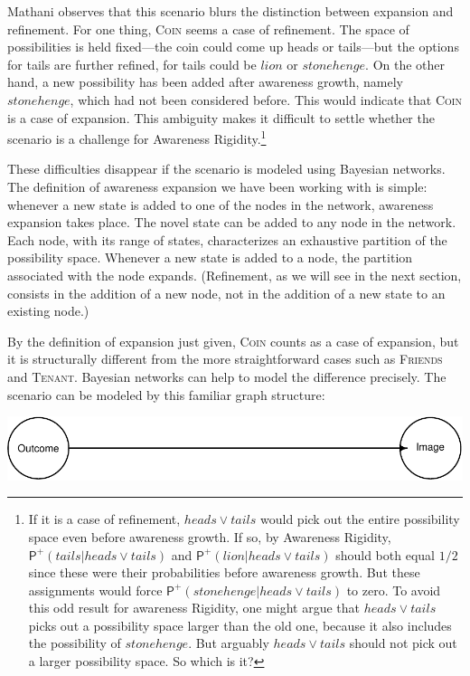 \documentclass[
  11pt,
  dvipsnames,enabledeprecatedfontcommands]{scrartcl}
\newcommand{\ppr}[2]{\ensuremath{\mathsf{P}^{#1}(#2)}}
\begin{document}
Mathani observes that this scenario blurs the distinction between
expansion and refinement. For one thing, \textsc{Coin} seems a case of
refinement. The space of possibilities is held fixed---the coin could
come up heads or tails---but the options for tails are further refined,
for tails could be \(lion\) or \(stonehenge\). On the other hand, a new
possibility has been added after awareness growth, namely
\(stonehenge\), which had not been considered before. This would
indicate that \textsc{Coin} is a case of expansion. This ambiguity makes
it difficult to settle whether the scenario is a challenge for Awareness
Rigidity.\footnote{ If it is a case of refinement, \(heads \vee tails\)
  would pick out the entire possibility space even before awareness
  growth. If so, by Awareness Rigidity,
  \(\ppr{+}{tails \vert heads \vee tails}\) and
  \(\ppr{+}{lion \vert heads \vee tails}\) should both equal \(1/2\)
  since these were their probabilities before awareness growth. But
  these assignments would force
  \(\ppr{+}{stonehenge \vert heads \vee tails}\) to zero. To avoid this
  odd result for awareness Rigidity, one might argue that
  \(heads \vee tails\) picks out a possibility space larger than the old
  one, because it also includes the possibility of \(stonehenge\). But
  arguably \(heads \vee tails\) should not pick out a larger possibility
  space. So which is it?}

These difficulties disappear if the scenario is modeled using Bayesian
networks. The definition of awareness expansion we have been working
with is simple: whenever a new state is added to one of the nodes in the
network, awareness expansion takes place. The novel state can be added
to any node in the network. Each node, with its range of states,
characterizes an exhaustive partition of the possibility space. Whenever
a new state is added to a node, the partition associated with the node
expands. (Refinement, as we will see in the next section, consists in
the addition of a new node, not in the addition of a new state to an
existing node.)

By the definition of expansion just given, \textsc{Coin} counts as a
case of expansion, but it is structurally different from the more
straightforward cases such as \textsc{Friends} and \textsc{Tenant}.
Bayesian networks can help to model the difference precisely. The
scenario can be modeled by this familiar graph structure:

\begin{center}\includegraphics[width=0.5\linewidth,height=0.3\textheight]{ReplyToSteeleStefansson5_files/figure-latex/tailsDAG-1} \end{center}
\end{document}
